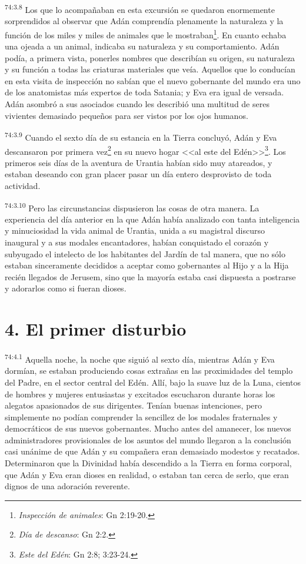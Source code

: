\par
\textsuperscript{74:3.8} Los que lo acompañaban en esta excursión se quedaron enormemente sorprendidos al observar que Adán comprendía plenamente la naturaleza y la función de los miles y miles de animales que le mostraban\footnote{\textit{Inspección de animales}: Gn 2:19-20.}. En cuanto echaba una ojeada a un animal, indicaba su naturaleza y su comportamiento. Adán podía, a primera vista, ponerles nombres que describían su origen, su naturaleza y su función a todas las criaturas materiales que veía. Aquellos que lo conducían en esta visita de inspección no sabían que el nuevo gobernante del mundo era uno de los anatomistas más expertos de toda Satania; y Eva era igual de versada. Adán asombró a sus asociados cuando les describió una multitud de seres vivientes demasiado pequeños para ser vistos por los ojos humanos.

\par
\textsuperscript{74:3.9} Cuando el sexto día de su estancia en la Tierra concluyó, Adán y Eva descansaron por primera vez\footnote{\textit{Día de descanso}: Gn 2:2.} en su nuevo hogar <<al este del Edén>>\footnote{\textit{Este del Edén}: Gn 2:8; 3:23-24.}. Los primeros seis días de la aventura de Urantia habían sido muy atareados, y estaban deseando con gran placer pasar un día entero desprovisto de toda actividad.

\par
\textsuperscript{74:3.10} Pero las circunstancias dispusieron las cosas de otra manera. La experiencia del día anterior en la que Adán había analizado con tanta inteligencia y minuciosidad la vida animal de Urantia, unida a su magistral discurso inaugural y a sus modales encantadores, habían conquistado el corazón y subyugado el intelecto de los habitantes del Jardín de tal manera, que no sólo estaban sinceramente decididos a aceptar como gobernantes al Hijo y a la Hija recién llegados de Jerusem, sino que la mayoría estaba casi dispuesta a postrarse y adorarlos como si fueran dioses.

\section*{4. El primer disturbio}
\par
\textsuperscript{74:4.1} Aquella noche, la noche que siguió al sexto día, mientras Adán y Eva dormían, se estaban produciendo cosas extrañas en las proximidades del templo del Padre, en el sector central del Edén. Allí, bajo la suave luz de la Luna, cientos de hombres y mujeres entusiastas y excitados escucharon durante horas los alegatos apasionados de sus dirigentes. Tenían buenas intenciones, pero simplemente no podían comprender la sencillez de los modales fraternales y democráticos de sus nuevos gobernantes. Mucho antes del amanecer, los nuevos administradores provisionales de los asuntos del mundo llegaron a la conclusión casi unánime de que Adán y su compañera eran demasiado modestos y recatados. Determinaron que la Divinidad había descendido a la Tierra en forma corporal, que Adán y Eva eran dioses en realidad, o estaban tan cerca de serlo, que eran dignos de una adoración reverente.

